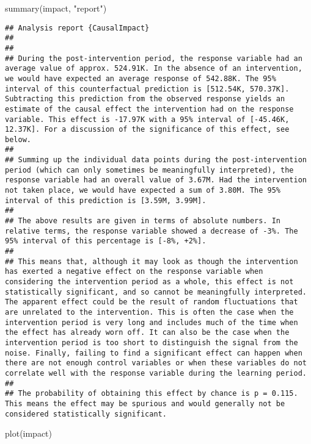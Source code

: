 \documentclass[
]{article}
\newenvironment{Shaded}{\begin{snugshade}}{\end{snugshade}}
\newcommand{\FunctionTok}[1]{\textcolor[rgb]{0.00,0.00,0.00}{#1}}
\newcommand{\NormalTok}[1]{#1}
\newcommand{\StringTok}[1]{\textcolor[rgb]{0.31,0.60,0.02}{#1}}
\begin{document}
\begin{Shaded}
\begin{Highlighting}[]
\FunctionTok{summary}\NormalTok{(impact, }\StringTok{"report"}\NormalTok{)}
\end{Highlighting}
\end{Shaded}

\begin{verbatim}
## Analysis report {CausalImpact}
## 
## 
## During the post-intervention period, the response variable had an average value of approx. 524.91K. In the absence of an intervention, we would have expected an average response of 542.88K. The 95% interval of this counterfactual prediction is [512.54K, 570.37K]. Subtracting this prediction from the observed response yields an estimate of the causal effect the intervention had on the response variable. This effect is -17.97K with a 95% interval of [-45.46K, 12.37K]. For a discussion of the significance of this effect, see below.
## 
## Summing up the individual data points during the post-intervention period (which can only sometimes be meaningfully interpreted), the response variable had an overall value of 3.67M. Had the intervention not taken place, we would have expected a sum of 3.80M. The 95% interval of this prediction is [3.59M, 3.99M].
## 
## The above results are given in terms of absolute numbers. In relative terms, the response variable showed a decrease of -3%. The 95% interval of this percentage is [-8%, +2%].
## 
## This means that, although it may look as though the intervention has exerted a negative effect on the response variable when considering the intervention period as a whole, this effect is not statistically significant, and so cannot be meaningfully interpreted. The apparent effect could be the result of random fluctuations that are unrelated to the intervention. This is often the case when the intervention period is very long and includes much of the time when the effect has already worn off. It can also be the case when the intervention period is too short to distinguish the signal from the noise. Finally, failing to find a significant effect can happen when there are not enough control variables or when these variables do not correlate well with the response variable during the learning period.
## 
## The probability of obtaining this effect by chance is p = 0.115. This means the effect may be spurious and would generally not be considered statistically significant.
\end{verbatim}

\begin{Shaded}
\begin{Highlighting}[]
\FunctionTok{plot}\NormalTok{(impact)}
\end{Highlighting}
\end{Shaded}
\end{document}
